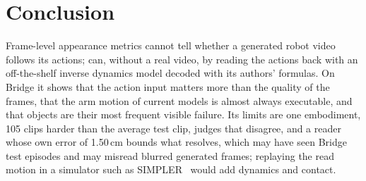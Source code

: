 \section{Conclusion}
\label{sec:conclusion}

Frame-level appearance metrics cannot tell whether a generated robot video follows its actions; \ours{} can, without a real video, by reading the actions back with an off-the-shelf inverse dynamics model decoded with its authors' formulas.
On Bridge it shows that the action input matters more than the quality of the frames, that the arm motion of current models is almost always executable, and that objects are their most frequent visible failure.
Its limits are one embodiment, 105 clips harder than the average test clip, judges that disagree, and a reader whose own error of 1.50\,cm bounds what \ours{} resolves, which may have seen Bridge test episodes and may misread blurred generated frames; replaying the read motion in a simulator such as SIMPLER~\cite{li2024simpler} would add dynamics and contact.
\par
